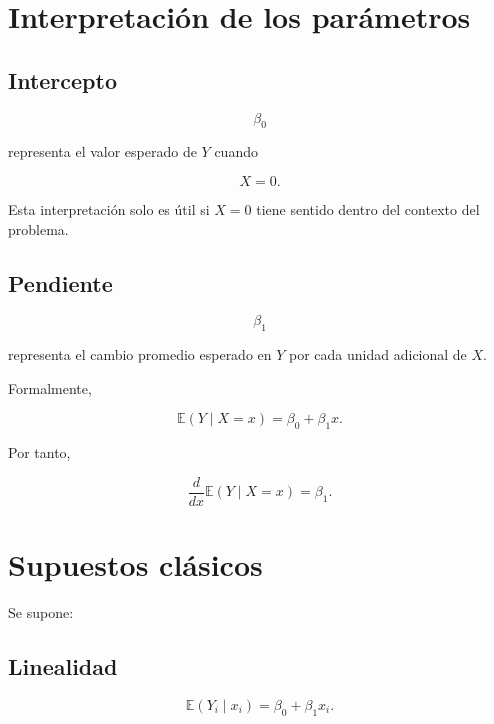 \documentclass[
  spanish,
  10.5pt,
  letterpaper,
  DIV=11,
  numbers=noendperiod,
  oneside,
  open=any]{scrreprt}
\theoremstyle{definition}
\theoremstyle{definition}
\theoremstyle{plain}
\theoremstyle{remark}
\begin{document}
\section*{Interpretación de los
parámetros}\label{interpretaciuxf3n-de-los-paruxe1metros}


\subsection*{Intercepto}\label{intercepto}

\[
\beta_0
\]

representa el valor esperado de \(Y\) cuando

\[
X=0.
\]

Esta interpretación solo es útil si \(X=0\) tiene sentido dentro del
contexto del problema.

\subsection*{Pendiente}\label{pendiente}

\[
\beta_1
\]

representa el cambio promedio esperado en \(Y\) por cada unidad
adicional de \(X\).

Formalmente,

\[
\mathbb{E}(Y\mid X=x)
=
\beta_0+\beta_1x.
\]

Por tanto,

\[
\frac{d}{dx}
\mathbb{E}(Y\mid X=x)
=
\beta_1.
\]

\section*{Supuestos clásicos}\label{supuestos-cluxe1sicos}


Se supone:

\subsection*{Linealidad}\label{linealidad}

\[
\mathbb{E}(Y_i\mid x_i)
=
\beta_0+\beta_1x_i.
\]
\end{document}
